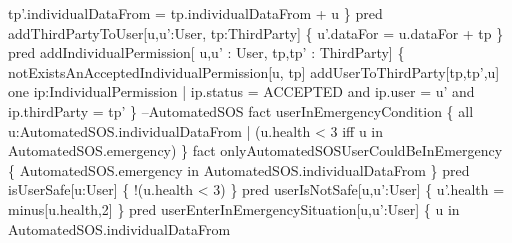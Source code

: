 \documentclass[a4paper]{article}
\begin{document}
{\newline 	tp'.individualDataFrom = tp.individualDataFrom + u
\newline \}
\newline 
\newline pred addThirdPartyToUser[u,u':User, tp:ThirdParty] \{
\newline 	u'.dataFor = u.dataFor + tp
\newline \}
\newline 
\newline pred addIndividualPermission[ u,u' : User, tp,tp' : ThirdParty] \{
\newline 
\newline 	notExistsAnAcceptedIndividualPermission[u, tp]
\newline 
\newline 	addUserToThirdParty[tp,tp',u]
\newline 
\newline 	one ip:IndividualPermission | ip.status = ACCEPTED and ip.user = u' and ip.thirdParty = tp'
\newline \}
\newline 
\newline --AutomatedSOS
\newline 
\newline fact userInEmergencyCondition \{
\newline 	all u:AutomatedSOS.individualDataFrom | (u.health < 3  iff u in AutomatedSOS.emergency) 
\newline \}
\newline 
\newline fact onlyAutomatedSOSUserCouldBeInEmergency \{
\newline 	AutomatedSOS.emergency in AutomatedSOS.individualDataFrom
\newline \}
\newline 
\newline pred isUserSafe[u:User] \{
\newline 	!(u.health < 3)
\newline \}
\newline 
\newline pred userIsNotSafe[u,u':User] \{
\newline 	u'.health = minus[u.health,2]
\newline \}
\newline 
\newline pred userEnterInEmergencySituation[u,u':User] \{
\newline 	u in AutomatedSOS.individualDataFrom
}
\end{document}

